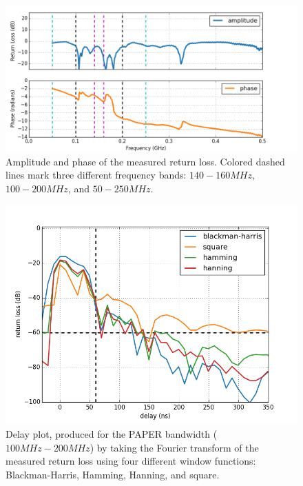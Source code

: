 \documentclass[12pt,preprint]{aastex}
\begin{document}
\begin{figure}[ht!]
\centering
\includegraphics[totalheight=0.4\textheight]{plots/frequency_amp_phase_fullbw.png}
\caption{Amplitude and phase of the measured return loss. Colored dashed lines
mark three different frequency bands: $140-160MHz$, $100-200MHz$, and
$50-250MHz$.}
\label{fig:freq}
\end{figure}


\begin{figure}[ht!]
\centering
\includegraphics[totalheight=0.4\textheight]{plots/bh_vs_sq.png}
\caption{Delay plot, produced for the PAPER bandwidth ($100MHz-200MHz$) by taking the Fourier transform of the measured return loss using four different window functions: Blackman-Harris, Hamming, Hanning, and square. }
\label{fig:window}
\end{figure}
\end{document}
